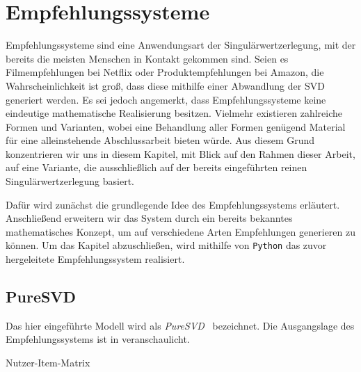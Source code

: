 \chapter{Empfehlungssysteme}\label{chap:rec}

Empfehlungssysteme sind eine Anwendungsart der Singulärwertzerlegung, mit der bereits die meisten Menschen in Kontakt gekommen sind.
Seien es Filmempfehlungen bei Netflix oder Produktempfehlungen bei Amazon, die Wahrscheinlichkeit ist groß, dass diese mithilfe einer Abwandlung der SVD generiert werden.
Es sei jedoch angemerkt, dass Empfehlungssysteme keine eindeutige mathematische Realisierung besitzen.
Vielmehr existieren zahlreiche Formen und Varianten, wobei eine Behandlung aller Formen genügend Material für eine alleinstehende Abschlussarbeit bieten würde.
Aus diesem Grund konzentrieren wir uns in diesem Kapitel, mit Blick auf den Rahmen dieser Arbeit, auf eine Variante, die ausschließlich auf der bereits eingeführten reinen Singulärwertzerlegung basiert.

Dafür wird zunächst die grundlegende Idee des Empfehlungssystems erläutert.
Anschließend erweitern wir das System durch ein bereits bekanntes mathematisches Konzept, um auf verschiedene Arten Empfehlungen generieren zu können.
Um das Kapitel abzuschließen, wird mithilfe von \texttt{Python} das zuvor hergeleitete Empfehlungssystem realisiert.

\section{PureSVD}

Das hier eingeführte Modell wird als \emph{PureSVD}~\cite{cremonesiPerformanceRecommenderAlgorithms2010a} bezeichnet. 
Die Ausgangslage des Empfehlungssystems ist in  veranschaulicht.
\begin{table}[tb]
    \centering
    \caption{Nutzer-Item-Matrix}\label{tab:rec:usit}
    
\end{table}

